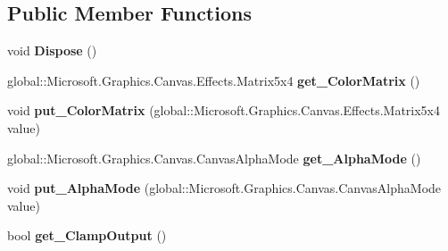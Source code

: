 \subsection*{Public Member Functions}
\begin{DoxyCompactItemize}
\item 
\mbox{\label{class_microsoft_1_1_graphics_1_1_canvas_1_1_effects_1_1_color_matrix_effect_ae0856b4a12befe77832ff39a67427820}} 
void {\bfseries Dispose} ()
\item 
\mbox{\label{class_microsoft_1_1_graphics_1_1_canvas_1_1_effects_1_1_color_matrix_effect_a74b7638815e4e2ee11e421a48b5a1a54}} 
global\+::\+Microsoft.\+Graphics.\+Canvas.\+Effects.\+Matrix5x4 {\bfseries get\+\_\+\+Color\+Matrix} ()
\item 
\mbox{\label{class_microsoft_1_1_graphics_1_1_canvas_1_1_effects_1_1_color_matrix_effect_a7d95e32f42f71f48b84cc81284f1023f}} 
void {\bfseries put\+\_\+\+Color\+Matrix} (global\+::\+Microsoft.\+Graphics.\+Canvas.\+Effects.\+Matrix5x4 value)
\item 
\mbox{\label{class_microsoft_1_1_graphics_1_1_canvas_1_1_effects_1_1_color_matrix_effect_abfdb6c68cffed7e33d14c5dac4b1ea80}} 
global\+::\+Microsoft.\+Graphics.\+Canvas.\+Canvas\+Alpha\+Mode {\bfseries get\+\_\+\+Alpha\+Mode} ()
\item 
\mbox{\label{class_microsoft_1_1_graphics_1_1_canvas_1_1_effects_1_1_color_matrix_effect_aecefb800adc320dde05a7b4b9ec65fe0}} 
void {\bfseries put\+\_\+\+Alpha\+Mode} (global\+::\+Microsoft.\+Graphics.\+Canvas.\+Canvas\+Alpha\+Mode value)
\item 
\mbox{\label{class_microsoft_1_1_graphics_1_1_canvas_1_1_effects_1_1_color_matrix_effect_a8f24f3336c23b20f9db23f8a09141338}} 
bool {\bfseries get\+\_\+\+Clamp\+Output} ()
\item 
\mbox{\label{class_microsoft_1_1_graphics_1_1_canvas_1_1_effects_1_1_color_matrix_effect_aef6085c7c12fe7233bd318ecd406ce13}} 

\end{DoxyCompactItemize}
